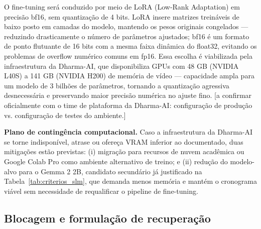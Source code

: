 \documentclass[
    article,
    12pt,
    oneside,
    a4paper,
    english,
    brazilian
    ]{abntex2}
\numberwithin{equation}{section}
\newenvironment{dica}{%
    \par\medskip
    \color{blue!60!black}\small\itshape
}{%
    \par\medskip
}
\begin{document}


%

O fine-tuning será conduzido por meio de LoRA (Low-Rank Adaptation) em precisão bf16, sem quantização de 4 bits. LoRA insere matrizes treináveis de baixo posto em camadas do modelo, mantendo os pesos originais congelados --- reduzindo drasticamente o número de parâmetros ajustados; bf16 é um formato de ponto flutuante de 16 bits com a mesma faixa dinâmica do float32, evitando os problemas de overflow numérico comuns em fp16. Essa escolha é viabilizada pela infraestrutura da Dharma-AI, que disponibiliza GPUs com 48 GB (NVIDIA L40S) a 141 GB (NVIDIA H200) de memória de vídeo --- capacidade ampla para um modelo de 3 bilhões de parâmetros, tornando a quantização agressiva desnecessária e preservando maior precisão numérica no ajuste fino. [a confirmar oficialmente com o time de plataforma da Dharma-AI: configuração de produção vs. configuração de testes do ambiente.]

\textbf{Plano de contingência computacional.} Caso a infraestrutura da Dharma-AI se torne indisponível, atrase ou ofereça VRAM inferior ao documentado, duas mitigações estão previstas: (i) migração para recursos de nuvem acadêmica ou Google Colab Pro como ambiente alternativo de treino; e (ii) redução do modelo-alvo para o Gemma 2 2B, candidato secundário já justificado na Tabela~\ref{tab:criterios_slm}, que demanda menos memória e mantém o cronograma viável sem necessidade de requalificar o pipeline de fine-tuning.

\subsection{Blocagem e formulação de recuperação}
\label{sec:blocagem}
\end{document}
